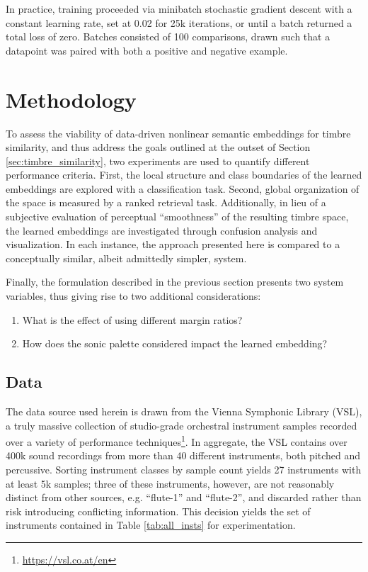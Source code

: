 In practice, training proceeded via minibatch stochastic gradient descent with a constant learning rate, set at 0.02 for 25k iterations, or until a batch returned a total loss of zero.
Batches consisted of 100 comparisons, drawn such that a datapoint was paired with both a positive and negative example.


\section{Methodology}
\label{sec:methodology}


To assess the viability of data-driven nonlinear semantic embeddings for timbre similarity, and thus address the goals outlined at the outset of Section \ref{sec:timbre_similarity}, two experiments are used to quantify different performance criteria.
First, the local structure and class boundaries of the learned embeddings are explored with a classification task.
Second, global organization of the space is measured by a ranked retrieval task.
Additionally, in lieu of a subjective evaluation of perceptual ``smoothness'' of the resulting timbre space, the learned embeddings are investigated through confusion analysis and visualization.
In each instance, the approach presented here is compared to a conceptually similar, albeit admittedly simpler, system.

Finally, the formulation described in the previous section presents two system variables, thus giving rise to two additional considerations:

\begin{enumerate}
\item What is the effect of using different margin ratios?
\item How does the sonic palette considered impact the learned embedding?
\end{enumerate}


\subsection{Data}
The data source used herein is drawn from the Vienna Symphonic Library (VSL), a truly massive collection of studio-grade orchestral instrument samples recorded over a variety of performance techniques\footnote{\url{https://vsl.co.at/en}}.
In aggregate, the VSL contains over 400k sound recordings from more than 40 different instruments, both pitched and percussive.
Sorting instrument classes by sample count yields 27 instruments with at least 5k samples; three of these instruments, however, are not reasonably distinct from other sources, e.g. ``flute-1'' and ``flute-2'', and discarded rather than risk introducing conflicting information.
This decision yields the set of instruments contained in Table \ref{tab:all_insts} for experimentation.


